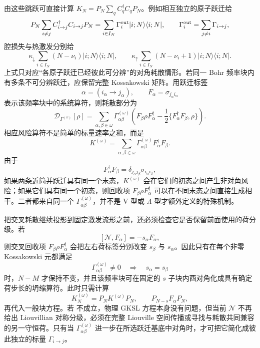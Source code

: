 由这些跳跃可直接计算 $K_N=P_N\sum_qC_q^\dagger C_qP_N$。例如相互独立的原子跃迁给
\[
P_N\sum_{i\ne j}C_{i\to j}^\dagger C_{i\to j}P_N
=\sum_{i\in I_N}\Gamma_i^{\rm out}|i;N\rangle\langle i;N|,
\qquad
\Gamma_i^{\rm out}=\sum_{j\ne i}\Gamma_{i\to j},
\]
腔损失与热激发分别给
\[
\kappa_\downarrow\sum_{i\in I_N}(N-\nu_i)|i;N\rangle\langle i;N|,
\qquad
\kappa_\uparrow\sum_{i\in I_N}(N-\nu_i+1)|i;N\rangle\langle i;N|.
\]
上式只对应“各原子跃迁已经彼此可分辨”的对角耗散情形。若同一 Bohr 频率块内有多条不可分辨跃迁，应保留完整 Kossakowski 矩阵。用跃迁标签
\[
\alpha=(i_\alpha\to j_\alpha),
\qquad
F_\alpha=\sigma_{j_\alpha i_\alpha}
\]
表示该频率块中的系统算符，则耗散部分为
\begin{equation}
\mathcal D_{\Gamma^{(\omega)}}[\rho]
=\sum_{\alpha,\beta\in\omega}
\Gamma_{\alpha\beta}^{(\omega)}
\left(F_\beta\rho F_\alpha^\dagger
-\frac12\{F_\alpha^\dagger F_\beta,\rho\}\right).
\label{eq:phys-oqs-general-transition-kossakowski}
\end{equation}
相应风险算符不是简单的标量速率之和，而是
\begin{equation}
K^{(\omega)}
=\sum_{\alpha,\beta\in\omega}
\Gamma_{\alpha\beta}^{(\omega)}F_\alpha^\dagger F_\beta.
\label{eq:phys-oqs-kossakowski-hazard}
\end{equation}
由于
\[
F_\alpha^\dagger F_\beta
=\delta_{j_\alpha j_\beta}
\sigma_{i_\alpha i_\beta},
\]
如果两条近简并跃迁具有同一个末态，$K^{(\omega)}$ 会在它们的初态之间产生非对角风险；如果它们具有同一个初态，则回收项
$F_\beta\rho F_\alpha^\dagger$ 可以在不同末态之间直接生成相干。二者都来自同一个 $\Gamma_{\alpha\beta}^{(\omega)}$，并不是 V 型或 $\Lambda$ 型才额外定义的特殊机制。

把交叉耗散继续投影到固定激发流形之前，还必须检查它是否保留前面使用的荷分级。若
\[
[\mathcal N,F_\alpha]=-s_\alpha F_\alpha,
\]
则交叉回收项 $F_\beta\rho F_\alpha^\dagger$ 会把左右荷标签分别改变 $s_\beta$ 与 $s_\alpha$。因此只有在每个非零 Kossakowski 元都满足
\begin{equation}
\Gamma_{\alpha\beta}^{(\omega)}\ne0
\quad\Longrightarrow\quad
s_\alpha=s_\beta
\label{eq:phys-oqs-kossakowski-grading-compatibility}
\end{equation}
时，$N-M$ 才保持不变，并且该频率块可在固定的 $s$ 子块内酉对角化成具有确定荷步长的坍缩算符。此时只需计算
\[
K_N^{(\omega)}=P_NK^{(\omega)}P_N,
\qquad
P_{N-s}F_\alpha P_N,
\]
再代入一般块方程。若 不成立，物理 GKSL 方程本身没有问题，但当前 $\mathcal N$ 不再给出 Liouvillian 对称分级，必须在完整 Liouville 空间传播或寻找与耗散共同兼容的另一守恒荷。只有当 $\Gamma_{\alpha\beta}^{(\omega)}$ 进一步在所选跃迁基底中对角时，才可把它简化成彼此独立的标量 $\Gamma_{i\to j}$。

